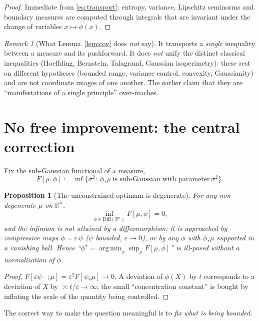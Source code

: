 \documentclass[11pt]{article}
\theoremstyle{plain}
\newtheorem{proposition}[theorem]{Proposition}
\theoremstyle{definition}
\theoremstyle{remark}
\newtheorem{remark}[theorem]{Remark}
\newcommand{\R}{\mathbb{R}}
\newcommand{\Diff}{\mathrm{Diff}}
\DeclareMathOperator*{\argmin}{arg\,min}
\begin{document}
\begin{proof}
Immediate from \eqref{eq:transport}: entropy, variance, Lipschitz seminorms and
boundary measures are computed through integrals that are invariant under the
change of variables $x\mapsto\phi(x)$.
\end{proof}

\begin{remark}[What Lemma~\ref{lem:cov} does \emph{not} say]
It transports a \emph{single} inequality between a measure and its pushforward.
It does \emph{not} unify the distinct classical inequalities (Hoeffding,
Bernstein, Talagrand, Gaussian isoperimetry): these rest on different hypotheses
(bounded range, variance control, convexity, Gaussianity) and are not coordinate
images of one another. The earlier claim that they are ``manifestations of a
single principle'' over-reaches.
\end{remark}

\section{No free improvement: the central correction}
\label{sec:nolunch}

Fix the sub-Gaussian functional of a measure,
\begin{equation}\label{eq:F}
F[\mu,\phi]:=\inf\{\sigma^2:\ \phi_*\mu\ \text{is sub-Gaussian with parameter}\ \sigma^2\}.
\end{equation}

\begin{proposition}[The unconstrained optimum is degenerate]\label{prop:degenerate}
For any non-degenerate $\mu$ on $\R^n$,
\[
\inf_{\phi\in\Diff(\R^n)} F[\mu,\phi]=0,
\]
and the infimum is not attained by a diffeomorphism: it is approached by
compressive maps $\phi=\varepsilon\,\psi$ ($\psi$ bounded, $\varepsilon\to0$), or by any
$\phi$ with $\phi_*\mu$ supported in a vanishing ball. Hence
``$\phi^\star=\argmin_\phi\sup_{\mu}F[\mu,\phi]$'' is \emph{ill-posed} without a
normalization of $\phi$.
\end{proposition}

\begin{proof}
$F[\varepsilon\psi\cdot\,;\mu]=\varepsilon^2 F[\psi_*\mu]\to0$. A deviation of
$\phi(X)$ by $t$ corresponds to a deviation of $X$ by $\asymp t/\varepsilon\to\infty$;
the small ``concentration constant'' is bought by inflating the scale of the
quantity being controlled.
\end{proof}

The correct way to make the question meaningful is to \emph{fix what is being
bounded}.
\end{document}
